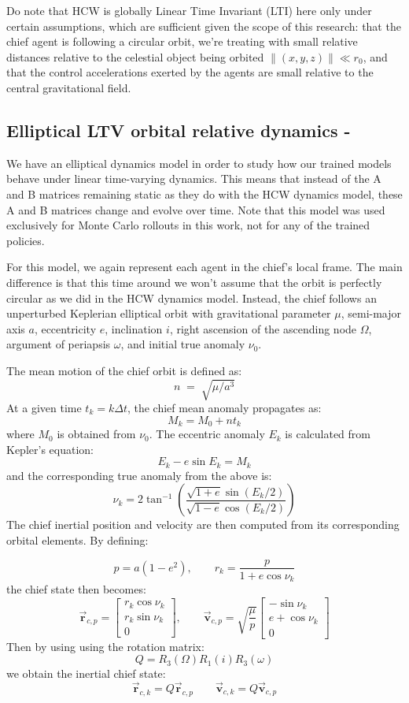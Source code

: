 Do note that HCW is globally Linear Time Invariant (LTI) here only under certain assumptions, which are sufficient given the scope of this research: that the chief agent is following a circular orbit, we're treating with small relative distances relative to the celestial object being orbited $\| (x,y,z)\| \ll r_0$, and that the control accelerations exerted by the agents are small relative to the central gravitational field.

\subsection{Elliptical LTV orbital relative dynamics - \cite{tschauner1965rendezvous}}
\label{subsec:dynamics-elliptic-ltv}

We have an elliptical dynamics model in order to study how our trained models behave under linear time-varying dynamics. This means that instead of the A and B matrices remaining static as they do with the HCW dynamics model, these A and B matrices change and evolve over time. Note that this model was used exclusively for Monte Carlo rollouts in this work, not for any of the trained policies.

For this model, we again represent each agent in the chief's local frame. The main difference is that this time around we won't assume that the orbit is perfectly circular as we did in the HCW dynamics model. Instead, the chief follows an unperturbed Keplerian elliptical orbit with gravitational parameter $\mu$, semi-major axis $a$, eccentricity $e$, inclination $i$, right ascension of the ascending node $\Omega$, argument of periapsis $\omega$, and initial true anomaly $\nu_0$. 


The mean motion of the chief orbit is defined as:
\[
n \;=\; \sqrt{\mu/a^3}
\]
At a given time $t_k = k\Delta t$, the chief mean anomaly propagates as:
\[
M_k = M_0 + nt_k
\]
where $M_0$ is obtained from $\nu_0$. The eccentric anomaly $E_k$ is calculated from Kepler's equation:
\[
E_k - e\sin E_k = M_k
\]
and the corresponding true anomaly from the above is:
\[
\nu_k
=
2 \tan^{-1}
\left(
\frac{\sqrt{1+e}\sin(E_k/2)}
     {\sqrt{1-e}\cos(E_k/2)}
\right)
\]
The chief inertial position and velocity are then computed from its corresponding orbital elements. By defining:


\[
p = a(1-e^2),
\qquad
r_k = \frac{p}{1+e\cos\nu_k}
\]
the chief state then becomes:
\[
\vec{\mathbf{r}}_{c,p}
=
\begin{bmatrix}
r_k\cos\nu_k\\
r_k\sin\nu_k\\
0
\end{bmatrix},
\qquad
\vec{\mathbf{v}}_{c,p}
=
\sqrt{\frac{\mu}{p}}
\begin{bmatrix}
-\sin\nu_k\\
e+\cos\nu_k\\
0
\end{bmatrix}
\]
Then by using using the rotation matrix:
\[
Q = R_3(\Omega)R_1(i)R_3(\omega)
\]
we obtain the inertial chief state:
\[
\vec{\mathbf{r}}_{c,k} = Q\vec{\mathbf{r}}_{c,p}
\qquad
\vec{\mathbf{v}}_{c,k} = Q\vec{\mathbf{v}}_{c,p}
\]

